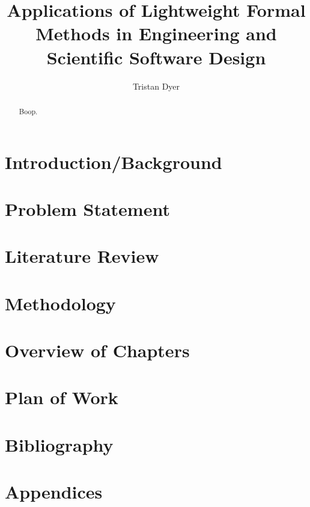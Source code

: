 \documentclass[draft, a4paper]{article}
\begin{document}
\title{Applications of Lightweight Formal Methods in Engineering and Scientific Software Design}
\author{Tristan Dyer}
\maketitle

\begin{abstract}
Boop.
\end{abstract}

\section{Introduction/Background}


\section{Problem Statement}


\section{Literature Review}


\section{Methodology}


\section{Overview of Chapters}


\section{Plan of Work}


\section{Bibliography}


\section{Appendices}

\end{document}
